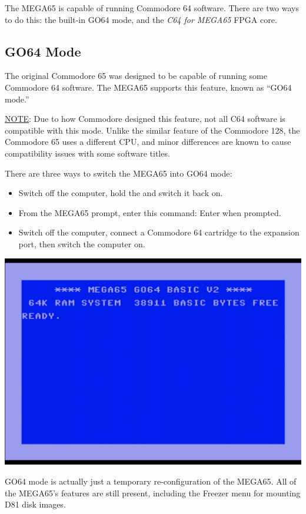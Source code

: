 The MEGA65 is capable of running Commodore 64 software. There are two ways to do this: the built-in GO64 mode, and the {\it C64 for MEGA65} FPGA core.

\subsection{GO64 Mode}

The original Commodore 65 was designed to be capable of running some Commodore 64 software. The MEGA65 supports this feature, known as ``GO64 mode.''

\underline{NOTE}: Due to how Commodore designed this feature, not all C64 software is compatible with this mode. Unlike the similar feature of the Commodore 128, the Commodore 65 uses a different CPU, and minor differences are known to cause compatibility issues with some software titles.

There are three ways to switch the MEGA65 into GO64 mode:

\begin{itemize}
    \item Switch off the computer, hold the \megasymbolkey and switch it back on.
    \item From the MEGA65  prompt, enter this command:  Enter  when prompted.
    \item Switch off the computer, connect a Commodore 64 cartridge to the expansion port, then switch the computer on.
\end{itemize}

\begin{center}
  \includegraphics[width=0.7\linewidth]{images/go64.png}
\end{center}

GO64 mode is actually just a temporary re-configuration of the MEGA65. All of the MEGA65's features are still present, including the Freezer menu for mounting D81 disk images.

